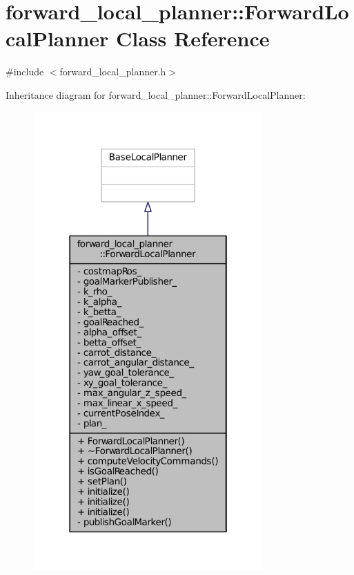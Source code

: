 \hypertarget{classforward__local__planner_1_1ForwardLocalPlanner}{}\section{forward\+\_\+local\+\_\+planner\+:\+:Forward\+Local\+Planner Class Reference}
\label{classforward__local__planner_1_1ForwardLocalPlanner}


{\ttfamily \#include $<$forward\+\_\+local\+\_\+planner.\+h$>$}



Inheritance diagram for forward\+\_\+local\+\_\+planner\+:\+:Forward\+Local\+Planner\+:
\nopagebreak
\begin{figure}[H]
\begin{center}
\leavevmode
\includegraphics[width=250pt]{classforward__local__planner_1_1ForwardLocalPlanner__inherit__graph}
\end{center}
\end{figure}


